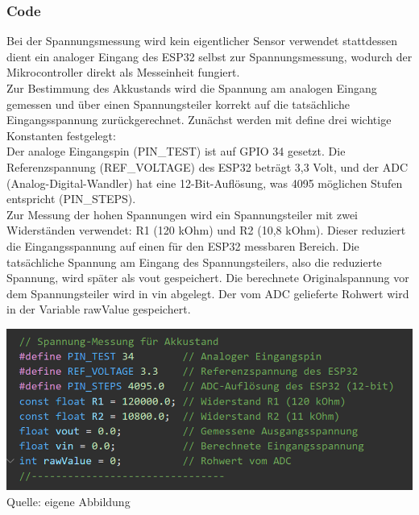 \documentclass[ngerman,12pt,a4paper]{article}
\begin{document}
	 \subsubsection{Code}
	 Bei der Spannungsmessung wird kein eigentlicher Sensor verwendet stattdessen dient ein analoger Eingang des ESP32 selbst zur Spannungsmessung, wodurch der Mikrocontroller direkt als Messeinheit fungiert.\\[0.5cm]
	 Zur Bestimmung des Akkustands wird die Spannung am analogen Eingang gemessen und über einen Spannungsteiler korrekt auf die tatsächliche Eingangsspannung zurückgerechnet.
	 Zunächst werden mit define drei wichtige Konstanten festgelegt: \\[0.3cm]
	 Der analoge Eingangspin (PIN\_TEST) ist auf GPIO 34 gesetzt. Die Referenzspannung (REF\_VOLTAGE) des ESP32 beträgt 3,3 Volt, und der ADC (Analog-Digital-Wandler) hat eine 12-Bit-Auflösung, was 4095 möglichen Stufen entspricht (PIN\_STEPS).\\[1cm]
	 Zur Messung der hohen Spannungen wird ein Spannungsteiler mit zwei Widerständen verwendet: R1 (120 kOhm) und R2 (10,8 kOhm). Dieser reduziert die Eingangsspannung auf einen für den ESP32 messbaren Bereich. Die tatsächliche Spannung am Eingang des Spannungsteilers, also die reduzierte Spannung, wird später als vout gespeichert. Die berechnete Originalspannung vor dem Spannungsteiler wird in vin abgelegt. Der vom ADC gelieferte Rohwert wird in der Variable rawValue gespeichert.
	 \begin{center}
	 	\begin{minipage}{1\textwidth}
	 		\centering
	 		\includegraphics[width=\textwidth]{Pictures/code_spannungsmessung_dek}
	 		\label{fig:code_spannungsmessung_dek}
	 		\vspace{-3pt}
	 		{\small Quelle: {eigene Abbildung}}
	 	\end{minipage}
	 \end{center}
	 
\end{document}

